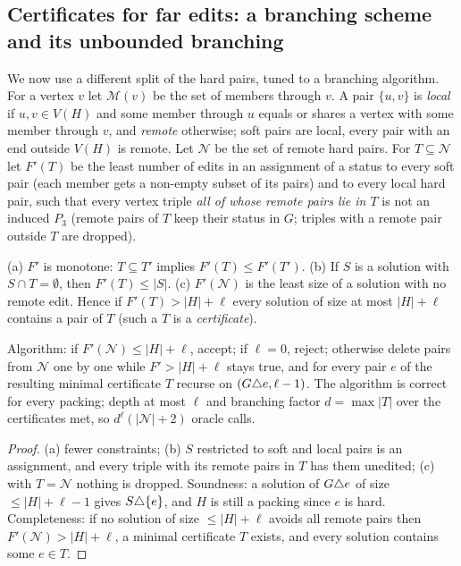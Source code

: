 \subsection{Certificates for far edits: a branching scheme and its unbounded branching}\label{sec:softcert}
We now use a different split of the hard pairs, tuned to a branching algorithm. For a vertex $v$ let $\mathcal M(v)$ be the set of members through $v$. A pair $\{u,v\}$ is \emph{local} if $u,v\in V(H)$ and some member through $u$ equals or shares a vertex with some member through $v$, and \emph{remote} otherwise; soft pairs are local, every pair with an end outside $V(H)$ is remote. Let $\mathcal N$ be the set of remote hard pairs. For $T\subseteq\mathcal N$ let $F'(T)$ be the least number of edits in an assignment of a status to every soft pair (each member gets a non-empty subset of its pairs) and to every local hard pair, such that every vertex triple \emph{all of whose remote pairs lie in $T$} is not an induced $P_3$ (remote pairs of $T$ keep their status in $G$; triples with a remote pair outside $T$ are dropped).
\begin{lemma}[Certificates]\label{lem:cert}
(a) $F'$ is monotone: $T\subseteq T'$ implies $F'(T)\le F'(T')$. (b) If $S$ is a solution with $S\cap T=\emptyset$, then $F'(T)\le|S|$. (c) $F'(\mathcal N)$ is the least size of a solution with no remote edit. Hence if $F'(T)>|H|+\ell$ every solution of size at most $|H|+\ell$ contains a pair of $T$ (such a $T$ is a \emph{certificate}).
\end{lemma}
\begin{theorem}\label{thm:B1}
Algorithm: if $F'(\mathcal N)\le|H|+\ell$, accept; if $\ell=0$, reject; otherwise delete pairs from $\mathcal N$ one by one while $F'>|H|+\ell$ stays true, and for every pair $e$ of the resulting minimal certificate $T$ recurse on $(G\triangle e,\ell-1)$. The algorithm is correct for every packing; depth at most $\ell$ and branching factor $d=\max|T|$ over the certificates met, so $d^{\ell}(|\mathcal N|+2)$ oracle calls.
\end{theorem}
\begin{proof}
(a) fewer constraints; (b) $S$ restricted to soft and local pairs is an assignment, and every triple with its remote pairs in $T$ has them unedited; (c) with $T=\mathcal N$ nothing is dropped. Soundness: a solution of $G\triangle e$ of size $\le|H|+\ell-1$ gives $S\triangle\{e\}$, and $H$ is still a packing since $e$ is hard. Completeness: if no solution of size $\le|H|+\ell$ avoids all remote pairs then $F'(\mathcal N)>|H|+\ell$, a minimal certificate $T$ exists, and every solution contains some $e\in T$.
\end{proof}
